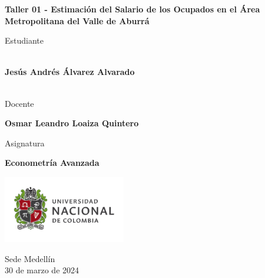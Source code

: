 \begin{titlepage}
   \Large{
   \begin{center}
       \vspace*{1cm}

       \textbf{Taller 01 - Estimación del Salario de los Ocupados en el Área Metropolitana del Valle de Aburrá}

            
       \vspace{1.5cm}
       
       Estudiante
       
       \vspace{0.5cm}
        
	\textbf{}\\    

	\textbf{Jesús Andrés Álvarez Alvarado}\\

	\textbf{}\\

              \vspace{1cm}
       
       Docente
       
       \vspace{0.5cm}

       \textbf{Osmar Leandro Loaiza Quintero}
       
       \vspace{0.4cm}

       \vspace{1.4cm}
       
       Asignatura
       
       \vspace{0.5cm}

       \textbf{Econometría Avanzada}

       \vfill

            
       \vspace{0.4cm}
     
       \includegraphics[width=0.4\textwidth]{logounal.png}
            
       Sede Medellín\\
       30 de marzo de 2024
       
   \end{center}
   }
\end{titlepage}